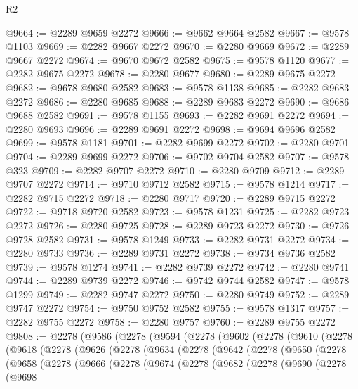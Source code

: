 \begin{lexlean}{R2}
\begin{coremodule}
@9664 := @2289 @9659 @2272
@9666 := @9662 @9664 @2582
@9667 := @9578 @1103
@9669 := @2282 @9667 @2272
@9670 := @2280 @9669
@9672 := @2289 @9667 @2272
@9674 := @9670 @9672 @2582
@9675 := @9578 @1120
@9677 := @2282 @9675 @2272
@9678 := @2280 @9677
@9680 := @2289 @9675 @2272
@9682 := @9678 @9680 @2582
@9683 := @9578 @1138
@9685 := @2282 @9683 @2272
@9686 := @2280 @9685
@9688 := @2289 @9683 @2272
@9690 := @9686 @9688 @2582
@9691 := @9578 @1155
@9693 := @2282 @9691 @2272
@9694 := @2280 @9693
@9696 := @2289 @9691 @2272
@9698 := @9694 @9696 @2582
@9699 := @9578 @1181
@9701 := @2282 @9699 @2272
@9702 := @2280 @9701
@9704 := @2289 @9699 @2272
@9706 := @9702 @9704 @2582
@9707 := @9578 @323
@9709 := @2282 @9707 @2272
@9710 := @2280 @9709
@9712 := @2289 @9707 @2272
@9714 := @9710 @9712 @2582
@9715 := @9578 @1214
@9717 := @2282 @9715 @2272
@9718 := @2280 @9717
@9720 := @2289 @9715 @2272
@9722 := @9718 @9720 @2582
@9723 := @9578 @1231
@9725 := @2282 @9723 @2272
@9726 := @2280 @9725
@9728 := @2289 @9723 @2272
@9730 := @9726 @9728 @2582
@9731 := @9578 @1249
@9733 := @2282 @9731 @2272
@9734 := @2280 @9733
@9736 := @2289 @9731 @2272
@9738 := @9734 @9736 @2582
@9739 := @9578 @1274
@9741 := @2282 @9739 @2272
@9742 := @2280 @9741
@9744 := @2289 @9739 @2272
@9746 := @9742 @9744 @2582
@9747 := @9578 @1299
@9749 := @2282 @9747 @2272
@9750 := @2280 @9749
@9752 := @2289 @9747 @2272
@9754 := @9750 @9752 @2582
@9755 := @9578 @1317
@9757 := @2282 @9755 @2272
@9758 := @2280 @9757
@9760 := @2289 @9755 @2272
@9808 := @2278
    (@9586
      (@2278
        (@9594
          (@2278
            (@9602
              (@2278
                (@9610
                  (@2278
                    (@9618
                      (@2278
                        (@9626
                          (@2278
                            (@9634
                              (@2278
                                (@9642
                                  (@2278
                                    (@9650
                                      (@2278
                                        (@9658
                                          (@2278
                                            (@9666
                                              (@2278
                                                (@9674
                                                  (@2278
                                                    (@9682
                                                      (@2278
                                                        (@9690
                                                          (@2278
                                                            (@9698

\end{coremodule}
\end{lexlean}
